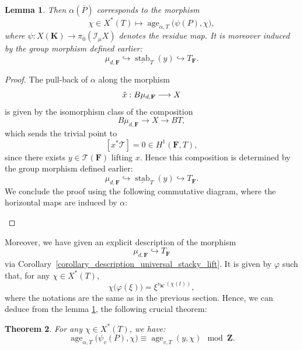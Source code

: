 \documentclass{proc-l}
\newcommand{\Z}{\mathbf{Z}}
\newcommand{\K}{\mathbf{K}}
\newcommand{\F}{\mathbf{F}}
\DeclareMathOperator{\mor}{Mor}
\DeclareMathOperator{\Hom}{Hom}
\DeclareMathOperator{\age}{age}
\DeclareMathOperator{\stab}{stab}
\newcommand{\stackT}{\mathcal{T}}
\newcommand{\sheafI}{\mathcal{I}}
\newcommand{\sheafO}{\mathcal{O}}
\newcommand{\sector}{\pi_0(\sheafI_{\mu} X)}
\newtheorem{theorem}{Theorem}[section]
\newtheorem{lemma}[theorem]{Lemma}
\theoremstyle{definition}
\theoremstyle{remark}
\numberwithin{equation}{section}
\begin{document}
\begin{lemma}\label{lemma_formule_lift_age}
Then $\alpha(\overline{P})$ corresponds to the morphism
\[
\chi \in X^{*}(T)
\longmapsto
\age_{\alpha,T}\bigl(\psi(P), \chi\bigr),
\]
where $\psi : X(\K) \rightarrow \sector$ denotes the residue map. It is moreover induced by the group morphism defined earlier:
\[
\mu_{d,\F}
\hookrightarrow
\underline{\stab}_{T}(y)
\hookrightarrow
T_{\F}.
\]
\end{lemma}

\begin{proof}
The pull-back of $\alpha$ along the morphism
\[
\Tilde{x} : B \mu_{d,\F} \longrightarrow X
\]
is given by the isomorphism class of the composition
\[
B \mu_{d,\F} \longrightarrow X \longrightarrow B T,
\]
which sends the trivial point to
\[
[x^* \stackT] = 0 \in H^1(\F,T),
\]
since there exists $y \in \stackT(\F)$ lifting $x$. Hence this composition is determined by the group morphism defined earlier:
\[
\mu_{d,\F}
\hookrightarrow
\underline{\stab}_{T}(y)
\hookrightarrow
T_{\F}.
\]
We conclude the proof using the following commutative diagram, where the horizontal maps are induced by $\alpha$:
\begin{center}
\end{center}
\end{proof}


Moreover, we have given an explicit description of the morphism
\[
\mu_{d,\F} \hookrightarrow T_{\F}
\]
via Corollary~\ref{corollary_description_universal_stacky_lift}. It is given by
$\varphi$ such that, for any $\chi \in X^*(T)$,
\[
\chi\bigl(\varphi(\xi)\bigr) = \xi^{v_{\K'}(\chi(t))},
\]
where the notations are the same as in the previous section. Hence, we can deduce from the lemma \ref{lemma_formule_lift_age}, the following crucial theorem:

\begin{theorem}\label{theorem_age_extended_universal_torsor}
For any $\chi \in X^{*}(T)$, we have:
\[
\age_{\alpha,T}\bigl(\psi_v(P),\chi\bigr) \equiv \age_{v,T}(y,\chi) \mod \Z .
\]
\end{theorem}
\end{document}
